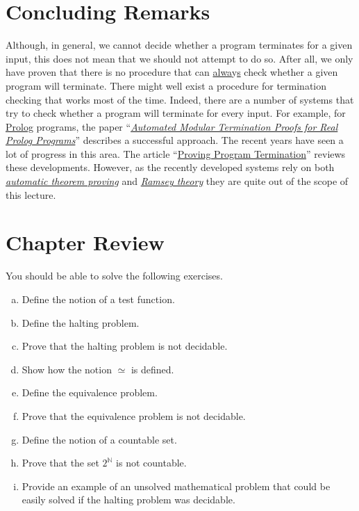 \section{Concluding Remarks}
Although, in general, we cannot decide whether a program terminates for a given input, this does not mean
that we should not attempt to do so.
After all, we only have proven that there is no procedure that
can \underline{alwa}y\underline{s} check whether a given program will terminate.
There might well exist a
procedure for termination checking that works most of the time.
Indeed, there are a number of
systems that try to check whether a program will terminate for every input.
For example, for
\href{https://en.wikipedia.org/wiki/Prolog}{Prolog}
programs, the paper
``\href{http://link.springer.com/chapter/10.1007%2F3-540-61739-6_44}{\emph{Automated Modular Termination Proofs for Real Prolog Programs}}''
\cite{mueller:1996} describes a successful approach.
The recent years have seen a lot of progress in
this area.  The article 
``\href{http://dl.acm.org/citation.cfm?id=1941509}{{Proving Program Termination}}''
\cite{cook:2011} reviews these developments.
However, as the recently developed systems rely on both
\href{http://en.wikipedia.org/wiki/Automated_theorem_proving}{\emph{automatic theorem proving}} and
\href{http://en.wikipedia.org/wiki/Ramsey_theory}{\emph{Ramsey theory}} they are quite out of the
scope of this lecture.
\pagebreak

\section{Chapter Review}
You should be able to solve the following exercises.
\begin{enumerate}[(a)]
\item Define the notion of a test function.
\item Define the halting problem.
\item Prove that the halting problem is not decidable.
\item Show how the notion $\simeq$ is defined.
\item Define the equivalence problem.
\item Prove that the equivalence problem is not decidable.
\item Define the notion of a countable set.
\item Prove that the set $2^{\mathbb{N}}$ is not countable.
\item Provide an example of an unsolved mathematical problem that could be easily solved if the halting problem
      was decidable.
\end{enumerate}

